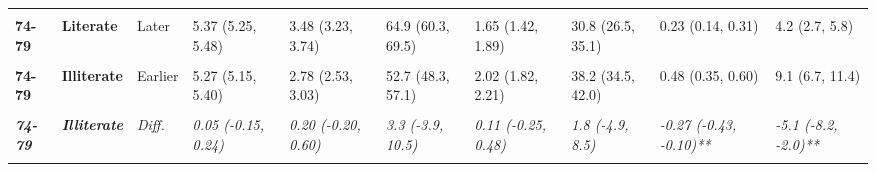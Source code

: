 \begin{table}[!h]
{{\begin{tabular}[t]{>{}l>{}lllllllll}
\cmidrule{1-10}
\textbf{\cellcolor{gray!10}{74-79}} & \textbf{\cellcolor{gray!10}{Literate}} & \cellcolor{gray!10}{Earlier} & \cellcolor{gray!10}{5.33 (5.22, 5.44)} & \cellcolor{gray!10}{3.00 (2.81, 3.20)} & \cellcolor{gray!10}{56.4 (52.7, 60.0)} & \cellcolor{gray!10}{1.93 (1.70, 2.16)} & \cellcolor{gray!10}{36.2 (32.2, 40.3)} & \cellcolor{gray!10}{0.40 (0.29, 0.50)} & \cellcolor{gray!10}{7.4 (5.4, 9.4)}\\
\cmidrule{1-10}
\textbf{74-79} & \textbf{Literate} & Later & 5.37 (5.25, 5.48) & 3.48 (3.23, 3.74) & 64.9 (60.3, 69.5) & 1.65 (1.42, 1.89) & 30.8 (26.5, 35.1) & 0.23 (0.14, 0.31) & 4.2 (2.7, 5.8)\\
\cmidrule{1-10}
\em{\textbf{\cellcolor{gray!10}{74-79}}} & \em{\textbf{\cellcolor{gray!10}{Literate}}} & \em{\cellcolor{gray!10}{Diff.}} & \em{\cellcolor{gray!10}{0.04 (-0.13, 0.20)}} & \em{\cellcolor{gray!10}{0.48 (0.16, 0.80)**}} & \em{\cellcolor{gray!10}{8.6 (2.7, 14.4)**}} & \em{\cellcolor{gray!10}{-0.28 (-0.60, 0.05)}} & \em{\cellcolor{gray!10}{-5.4 (-11.3, 0.5)}} & \em{\cellcolor{gray!10}{-0.17 (-0.30, -0.03)*}} & \em{\cellcolor{gray!10}{-3.2 (-5.7, -0.7)*}}\\
\cmidrule{1-10}
\textbf{74-79} & \textbf{Illiterate} & Earlier & 5.27 (5.15, 5.40) & 2.78 (2.53, 3.03) & 52.7 (48.3, 57.1) & 2.02 (1.82, 2.21) & 38.2 (34.5, 42.0) & 0.48 (0.35, 0.60) & 9.1 (6.7, 11.4)\\
\cmidrule{1-10}
\textbf{\cellcolor{gray!10}{74-79}} & \textbf{\cellcolor{gray!10}{Illiterate}} & \cellcolor{gray!10}{Later} & \cellcolor{gray!10}{5.32 (5.17, 5.46)} & \cellcolor{gray!10}{2.98 (2.66, 3.30)} & \cellcolor{gray!10}{56.0 (50.3, 61.7)} & \cellcolor{gray!10}{2.13 (1.82, 2.44)} & \cellcolor{gray!10}{40.0 (34.4, 45.7)} & \cellcolor{gray!10}{0.21 (0.10, 0.32)} & \cellcolor{gray!10}{4.0 (1.9, 6.0)}\\
\cmidrule{1-10}
\em{\textbf{74-79}} & \em{\textbf{Illiterate}} & \em{Diff.} & \em{0.05 (-0.15, 0.24)} & \em{0.20 (-0.20, 0.60)} & \em{3.3 (-3.9, 10.5)} & \em{0.11 (-0.25, 0.48)} & \em{1.8 (-4.9, 8.5)} & \em{-0.27 (-0.43, -0.10)**} & \em{-5.1 (-8.2, -2.0)**}\\
\cmidrule{1-10}
\textbf{\cellcolor{gray!10}{80-85}} & \textbf{\cellcolor{gray!10}{Literate}} & \cellcolor{gray!10}{Earlier} & \cellcolor{gray!10}{4.81 (4.64, 4.99)} & \cellcolor{gray!10}{2.73 (2.45, 3.02)} & \cellcolor{gray!10}{56.8 (50.8, 62.8)} & \cellcolor{gray!10}{1.71 (1.43, 2.00)} & \cellcolor{gray!10}{35.6 (30.1, 41.1)} & \cellcolor{gray!10}{0.37 (0.21, 0.53)} & \cellcolor{gray!10}{7.6 (4.3, 10.9)}\\

\end{tabular}}}
\end{table}
